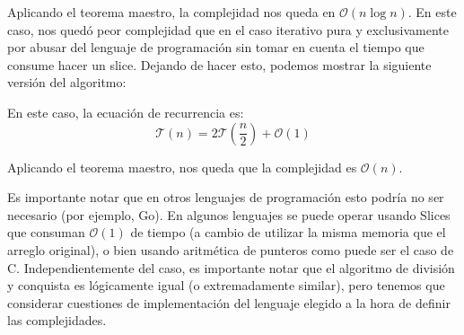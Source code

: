 Aplicando el teorema maestro, la complejidad nos queda en $\mathcal{O}\left(n \log n\right)$. En este caso, nos quedó peor complejidad que en el caso iterativo pura y exclusivamente por abusar del lenguaje de programación sin tomar en cuenta el tiempo que consume hacer un slice. Dejando de hacer esto, podemos mostrar la siguiente versión del algoritmo: 

En este caso, la ecuación de recurrencia es: 
\begin{equation*}
    \mathcal{T}(n) = 2 \mathcal{T}\left(\frac{n}{2}\right) + \mathcal{O}(1)
\end{equation*}

Aplicando el teorema maestro, nos queda que la complejidad es $\mathcal{O}\left(n\right)$.

Es importante notar que en otros lenguajes de programación esto podría no ser necesario (por ejemplo, Go). En algunos lenguajes se puede operar usando Slices que consuman $\mathcal{O}(1)$ de tiempo (a cambio de utilizar la misma memoria que el arreglo original), o bien usando aritmética de punteros como puede ser el caso de C. Independientemente del caso, es importante notar que el algoritmo de división y conquista es lógicamente igual (o extremadamente similar), pero tenemos que considerar cuestiones de implementación del lenguaje elegido a la hora de definir las complejidades. 
